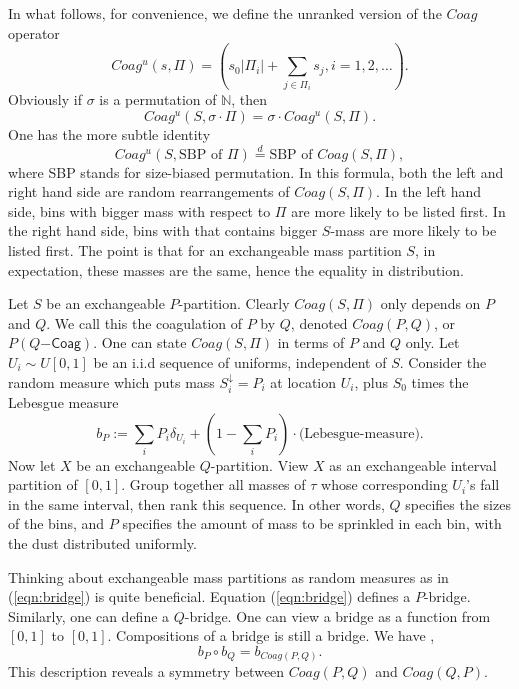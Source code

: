 In what follows, for convenience, we define the unranked version of the $Coag$ operator
\begin{equation}\label{eqn:coag.u}
Coag^u(s,\Pi) = (s_0|\Pi_i| + \sum_{j \in \Pi_i}s_j, i = 1,2,\ldots). 
\end{equation}
Obviously if $\sigma$ is a permutation of $\mathbb{N}$, then
$$ Coag^u(S,\sigma\cdot\Pi) = \sigma \cdot Coag^u(S,\Pi). $$
One has the more subtle identity
$$ Coag^u(S,\mbox{SBP of } \Pi) \stackrel{d}{=} \mbox{SBP of } Coag(S, \Pi), $$
where SBP stands for size-biased permutation. In this formula, both the left and right hand side are random rearrangements of $Coag(S,\Pi)$. In the left hand side, bins with bigger mass with respect to $\Pi$ are more likely to be listed first. In the right hand side, bins with that contains bigger $S$-mass are more likely to be listed first. The point is that for an exchangeable mass partition $S$, in expectation, these masses are the same, hence the equality in distribution. 

Let $S$ be an exchangeable $P$-partition. Clearly $Coag(S,\Pi)$ only depends on $P$ and $Q$. We call this the coagulation of $P$ by $Q$, denoted $Coag(P,Q)$, or $P(Q\mathsf{-Coag})$. One can state $Coag(S, \Pi)$ in terms of $P$ and $Q$ only. Let $U_i \sim U[0,1]$ be an i.i.d sequence of uniforms, independent of $S$. Consider the random measure which puts mass $S_i^\downarrow = P_i$ at location $U_i$, plus $S_0$ times the Lebesgue measure
\begin{equation}\label{eqn:bridge}
b_P := \sum_iP_i \delta_{U_i} + (1-\sum_iP_i) \cdot \mbox{(Lebesgue-measure)}.
\end{equation}
Now let $X$ be an exchangeable $Q$-partition. View $X$ as an exchangeable interval partition of $[0,1]$. Group together all masses of $\tau$ whose corresponding $U_i$'s fall in the same interval, then rank this sequence. In other words, $Q$ specifies the sizes of the bins, and $P$ specifies the amount of mass to be sprinkled in each bin, with the dust distributed uniformly. 

Thinking about exchangeable mass partitions as random measures as in (\ref{eqn:bridge}) is quite beneficial. Equation (\ref{eqn:bridge}) defines a $P$-bridge. Similarly, one can define a $Q$-bridge. One can view a bridge as a function from $[0,1]$ to $[0,1]$. Compositions of a bridge is still a bridge. We have \cite[Lemma 5.18]{CSP}, \cite[Lemma XXX]{Bertoin}
$$ b_P \circ b_Q = b_{Coag(P,Q)}. $$
This description reveals a symmetry between $Coag(P,Q)$ and $Coag(Q,P)$. 

